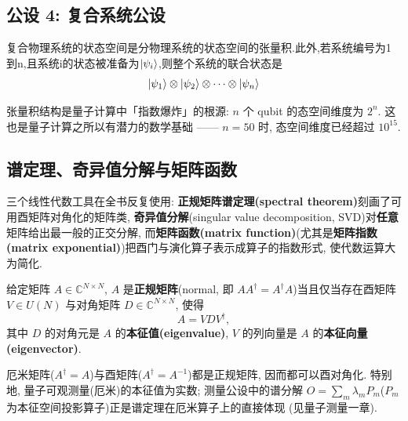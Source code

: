 \documentclass[utf8]{article} %
\numberwithin{equation}{section}   %
\newtheorem{Thm}{\hskip 2em {\color{blue} 定理}}[subsection]
\newtheorem{Cor}{\hskip 2em {\color{cyan} 推论}}[subsection]
\begin{document}
\subsection{公设 4: 复合系统公设}

\begin{Thm}
    复合物理系统的状态空间是分物理系统的状态空间的张量积.此外,若系统编号为1到n,且系统i的状态被准备为$\ket{\psi_i}$,则整个系统的联合状态是
	\begin{equation}
        \ket{\psi_1}\otimes\ket{\psi_2}\otimes\cdots\otimes\ket{\psi_n}
    \end{equation}
\end{Thm}

张量积结构是量子计算中「指数爆炸」的根源: $n$ 个 qubit 的态空间维度为 $2^n$.
这也是量子计算之所以有潜力的数学基础 —— $n=50$ 时, 态空间维度已经超过 $10^{15}$.

\subsection{谱定理、奇异值分解与矩阵函数}\label{sec:matrixfunc}

三个线性代数工具在全书反复使用: \textbf{正规矩阵谱定理(spectral theorem)}刻画了可用酉矩阵对角化的矩阵类,
\textbf{奇异值分解}(singular value decomposition, SVD)对\textbf{任意}矩阵给出最一般的正交分解,
而\textbf{矩阵函数(matrix function)}(尤其是\textbf{矩阵指数(matrix exponential)})把酉门与演化算子表示成算子的指数形式, 使代数运算大为简化.

\begin{Thm}[正规矩阵的谱定理]
    给定矩阵 $A \in \mathbb{C}^{N\times N}$, $A$ 是\textbf{正规矩阵}(normal, 即
    $AA^\dagger = A^\dagger A$)当且仅当存在酉矩阵 $V \in U(N)$ 与对角矩阵 $D \in \mathbb{C}^{N\times N}$,
    使得
    \begin{equation}
        A = V D V^\dagger,
    \end{equation}
    其中 $D$ 的对角元是 $A$ 的\textbf{本征值(eigenvalue)}, $V$ 的列向量是 $A$ 的\textbf{本征向量(eigenvector)}.
\end{Thm}

\begin{Cor}
    厄米矩阵($A^\dagger = A$)与酉矩阵($A^\dagger = A^{-1}$)都是正规矩阵, 因而都可以酉对角化.
    特别地, 量子可观测量(厄米)的本征值为实数; 测量公设中的谱分解
    $O = \sum_m \lambda_m P_m$($P_m$ 为本征空间投影算子)正是谱定理在厄米算子上的直接体现
    (见量子测量一章).
\end{Cor}
\end{document}
